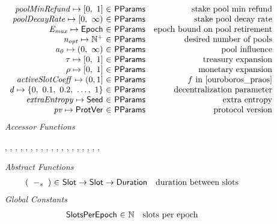 \begin{figure*}[htb]
\begin{equation*}
\begin{array}{r@{~\in~}lr}
        \var{poolMinRefund} \mapsto \unitInterval & \PParams & \text{stake pool min refund}\\
        \var{poolDecayRate} \mapsto \nonnegReals & \PParams & \text{stake pool decay rate}\\
        \var{E_{max}} \mapsto \Epoch & \PParams & \text{epoch bound on pool retirement}\\
        \var{n_{opt}} \mapsto \Npos & \PParams & \text{desired number of pools}\\
        \var{a_0} \mapsto \posReals & \PParams & \text{pool influence}\\
        \tau \mapsto \unitInterval & \PParams & \text{treasury expansion}\\
        \rho \mapsto \unitInterval & \PParams & \text{monetary expansion}\\
        \var{activeSlotCoeff} \mapsto (0, 1] & \PParams & f\text{ in \cite{ouroboros_praos}}\\
        \var{d} \mapsto \{0,~0.1,~0.2,~\ldots,~1\} & \PParams & \text{decentralization parameter}\\
        \var{extraEntropy} \mapsto \Seed & \PParams & \text{extra entropy}\\
        \var{pv} \mapsto \ProtVer & \PParams & \text{protocol version}\\
      \end{array}
  \end{equation*}
  \emph{Accessor Functions}
  \begin{center}
    ,
    ,
    ,
    ,
    ,
    ,
    ,
    ,
    ,
    ,
    ,
    ,
    ,
    ,
    ,
    ,
    ,
    ,
    ,
  \end{center}
  \emph{Abstract Functions}
  \begin{equation*}
    \begin{array}{r@{~\in~}lr}
      (\slotminus{}{}) & \Slot \to \Slot \to \Duration
                       & \text{duration between slots}
    \end{array}
  \end{equation*}
  \emph{Global Constants}
  \begin{equation*}
    \begin{array}{r@{~\in~}lr}
      \SlotsPerEpoch & \N & \text{slots per epoch} \\

\end{array}
\end{equation*}
\end{figure*}
